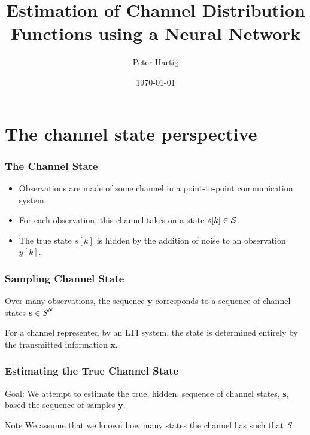 \documentclass[10pt,tgadventor, onlymath]{beamer}
\title{\large \bfseries Estimation of Channel Distribution Functions using a Neural Network}
\author{Peter Hartig\\[3ex]
}
\date{\today}
\begin{document}
\frame{
\thispagestyle{empty}
\titlepage
}

\frame{
\tableofcontents
}

\section{The channel state perspective}

\begin{frame}
\frametitle{The Channel State}
\begin{itemize}
\item 
	Observations are made of some channel in a point-to-point communication system.
\item 
	For each observation, this channel takes on a state $s[k]\in \cal{S}$. 
\item 
	The true state $s[k]$ is hidden by the addition of noise to an observation $y[k]$.
\end{itemize}
\end{frame}
\begin{frame}

\frametitle{Sampling Channel State}
Over many observations, the sequence $\mathbf{y}$ corresponds to a sequence of channel states $\mathbf{s}\in\textit{\cal{S}}^N$
\begin{figure}[H]
\begin{center}
\end{center}
\end{figure}
\pause
For a channel represented by an LTI system, the state is determined entirely by the transmitted information $\mathbf{x}$.
\end{frame}

\begin{frame}
\frametitle{Estimating the True Channel State}
\begin{block}{Goal:}
We attempt to estimate the true, hidden, sequence of channel states, $\mathbf{s}$, based the sequence of samples $\mathbf{y}$.
\end{block}

\begin{block}{Note}
We assume that we known how many states the channel has such that $\textit{\cal{S}}$
\end{block}

\end{frame}
\end{document}
